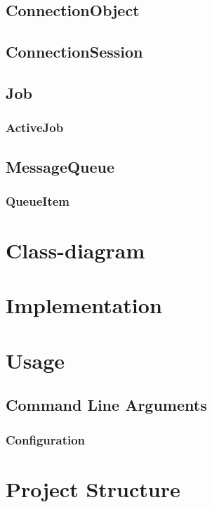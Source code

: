 \documentclass[12pt, letterpaper]{article}
\begin{document}
\subsection{ConnectionObject}

\subsection{ConnectionSession}

\subsection{Job}

\subsubsection{ActiveJob}

\subsection{MessageQueue}

\subsubsection{QueueItem}

\section{Class-diagram}

\section{Implementation}


\section{Usage}
\label{usage}

\subsection{Command Line Arguments}

\subsubsection{Configuration}


\newpage

\section{Project Structure}


\newpage

\printbibliography
\end{document}

